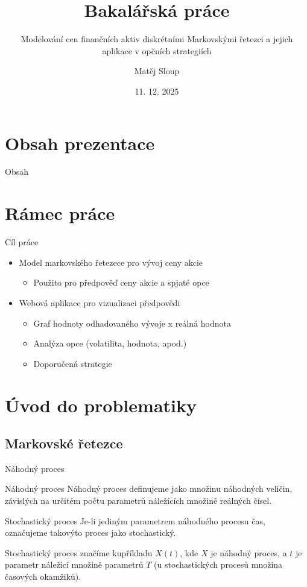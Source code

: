 \documentclass{beamer}
\author{Matěj Sloup}
\date{11. 12. 2025}
\title{Bakalářská práce}
\subtitle{Modelování cen finančních aktiv diskrétními Markovskými řetezci a jejich aplikace v opčních strategiích}
\begin{document}
\begin{frame}
  \titlepage
\end{frame}

\section{Obsah prezentace}
\begin{frame}{Obsah}
  \tableofcontents
\end{frame}

\section{Rámec práce}
\begin{frame}{Cíl práce}
  \begin{itemize}
    \item{Model markovského řetezece pro vývoj ceny akcie}
      \begin{itemize}
        \item{Použito pro předpověď ceny akcie a spjaté opce}
      \end{itemize}
    \item{Webová aplikace pro vizualizaci předpovědi}
      \begin{itemize}
        \item{Graf hodnoty odhadovaného vývoje x reálná hodnota}
        \item{Analýza opce (volatilita, hodnota, apod.)}
        \item{Doporučená strategie}
      \end{itemize}
  \end{itemize}
\end{frame}

\section{Úvod do problematiky}

\subsection{Markovské řetezce}

\begin{frame}{Náhodný proces}
  \begin{block}{Náhodný proces}
    Náhodný proces definujeme jako množinu náhodných veličin, závislých na určitém počtu parametrů náležících množině reálných čísel. \cite{korenar2010}
  \end{block}

  \begin{block}{Stochastický proces}
    Je-li jediným parametrem náhodného procesu čas, označujeme takovýto proces jako stochastický. \cite{korenar2010}
  \end{block}

  Stochastický proces značíme kupříkladu $X(t)$, kde $X$ je náhodný proces, a $t$ je parametr náležicí množině parametrů $T$ (u stochastických procesů množina časových okamžiků). \cite{korenar2010}
\end{frame}
\end{document}
